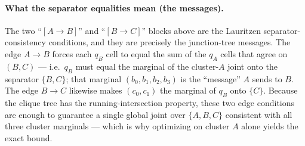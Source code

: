 \documentclass[11pt]{article}
\begin{document}
\paragraph{What the separator equalities mean (the messages).} The two ``$[A\!\to\!B]$'' and
``$[B\!\to\!C]$'' blocks above are the Lauritzen separator-consistency conditions, and they are
precisely the junction-tree messages. The edge $A\!\to\!B$ forces each $q_B$ cell to equal the
sum of the $q_A$ cells that agree on $(B,C)$ --- i.e.\ $q_B$ must equal the marginal of the
cluster-$A$ joint onto the separator $\{B,C\}$; that marginal $(b_0,b_1,b_2,b_3)$ is the
``message'' $A$ sends to $B$. The edge $B\!\to\!C$ likewise makes $(c_0,c_1)$ the marginal of
$q_B$ onto $\{C\}$. Because the clique tree has the running-intersection property, these two
edge conditions are enough to guarantee a single global joint over $\{A,B,C\}$ consistent with
all three cluster marginals --- which is why optimizing on cluster $A$ alone yields the exact
bound.
\end{document}
